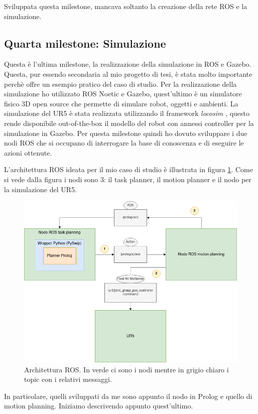 Sviluppata questa milestone, mancava soltanto la creazione della rete ROS e la simulazione. 


\subsection{Quarta milestone: Simulazione}
\label{subsec:simulation}
Questa è l'ultima milestone, la realizzazione della simulazione in ROS e Gazebo. Questa, pur essendo secondaria al mio progetto di tesi, è stata molto importante perchè offre un esempio pratico del caso di studio.
Per la realizzazione della simulazione ho utilizzato ROS Noetic e Gazebo, quest'ultimo è un simulatore fisico 3D open source che permette di simulare robot, oggetti e ambienti.
La simulazione del UR5 è stata realizzata utilizzando il framework \textit{locosim} \cite{focchi2023locosim}, questo rende disponibile out-of-the-box il modello del robot con annessi controller per la simulazione in Gazebo.
Per questa milestone quindi ho dovuto sviluppare i due nodi ROS che si occupano di interrogare la base di conoscenza e di eseguire le azioni ottenute.

L'architettura ROS ideata per il mio caso di studio è illustrata in figura \ref{fig:archros}. Come si vede dalla figura i nodi sono 3: il task planner, il motion planner e il nodo per la simulazione del UR5. 
\begin{figure}[t]
    \centering
    \includegraphics[scale=0.5]{images/ArchROS.drawio.png}
    \caption{Architettura ROS. In verde ci sono i nodi mentre in grigio chiaro i topic con i relativi messaggi.}
    \label{fig:archros}
\end{figure}
In particolare, quelli sviluppati da me sono appunto il nodo in Prolog e quello di motion planning. Iniziamo descrivendo appunto quest'ultimo.

